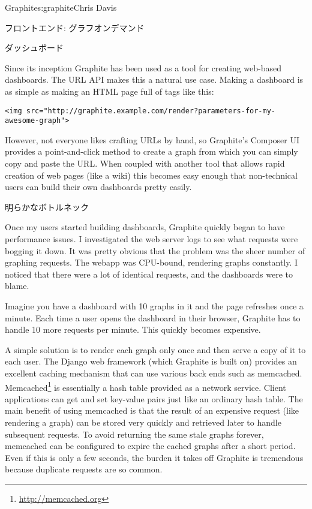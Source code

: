 \begin{aosachapter}{Graphite}{s:graphite}{Chris Davis}
\begin{aosasect1}{フロントエンド: グラフオンデマンド}

\end{aosasect1}

\begin{aosasect1}{ダッシュボード}

Since its inception Graphite has been used as a tool for creating
web-based dashboards. The URL API makes this a natural use
case. Making a dashboard is as simple as making an HTML page full of
tags like this:

\begin{verbatim}
<img src="http://graphite.example.com/render?parameters-for-my-awesome-graph">
\end{verbatim}

However, not everyone likes crafting URLs by hand, so Graphite's Composer UI
provides a point-and-click method to create a graph from which you can
simply copy and paste the URL\@. When coupled with another tool that
allows rapid creation of web pages (like a wiki) this becomes easy
enough that non-technical users can build their own dashboards pretty
easily.

\end{aosasect1}

\begin{aosasect1}{明らかなボトルネック}

Once my users started building dashboards, Graphite quickly began to
have performance issues. I investigated the web server logs to see
what requests were bogging it down. It was pretty obvious that the
problem was the sheer number of graphing requests. The webapp was
CPU-bound, rendering graphs constantly. I noticed that there were a
lot of identical requests, and the dashboards were to blame.

Imagine you have a dashboard with 10 graphs in it and the page
refreshes once a minute. Each time a user opens the dashboard in
their browser, Graphite has to handle 10 more requests per
minute. This quickly becomes expensive.

A simple solution is to render each graph only once and then serve a
copy of it to each user. The Django web framework (which Graphite is
built on) provides an excellent caching mechanism that can use various
back ends such as memcached. Memcached\footnote{\url{http://memcached.org}}
is essentially a hash table
provided as a network service. Client applications can get and set
key-value pairs just like an ordinary hash table. The main benefit of
using memcached is that the result of an expensive request (like
rendering a graph) can be stored very quickly and retrieved later to
handle subsequent requests. To avoid returning the same stale graphs
forever, memcached can be configured to expire the cached graphs after
a short period. Even if this is only a few seconds, the burden it
takes off Graphite is tremendous because duplicate requests are so
common.


\end{aosasect1}
\end{aosachapter}
